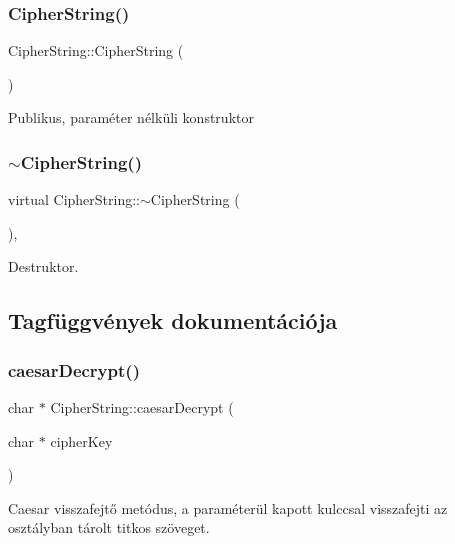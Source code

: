 \subsubsection{\texorpdfstring{Cipher\+String()}{CipherString()}}
{\footnotesize\ttfamily Cipher\+String\+::\+Cipher\+String (\begin{DoxyParamCaption}{ }\end{DoxyParamCaption})\hspace{0.3cm}{\ttfamily [inline]}}

Publikus, paraméter nélküli konstruktor \mbox{\label{class_cipher_string_a805b365286a97e096db9c04b555f3ef9}} 
\subsubsection{\texorpdfstring{$\sim$\+Cipher\+String()}{~CipherString()}}
{\footnotesize\ttfamily virtual Cipher\+String\+::$\sim$\+Cipher\+String (\begin{DoxyParamCaption}{ }\end{DoxyParamCaption})\hspace{0.3cm}{\ttfamily [inline]}, {\ttfamily [virtual]}}

Destruktor. 

\subsection{Tagfüggvények dokumentációja}
\mbox{\label{class_cipher_string_a06310ff798cab137ae7faa769fc512d8}} 
\subsubsection{\texorpdfstring{caesar\+Decrypt()}{caesarDecrypt()}}
{\footnotesize\ttfamily char $\ast$ Cipher\+String\+::caesar\+Decrypt (\begin{DoxyParamCaption}\item[{char $\ast$}]{cipher\+Key }\end{DoxyParamCaption})}

Caesar visszafejtő metódus, a paraméterül kapott kulccsal visszafejti az osztályban tárolt titkos szöveget.


